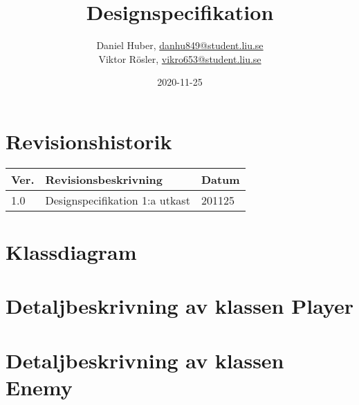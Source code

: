 \documentclass{TDP005mall}
\author{Daniel Huber, \url{danhu849@student.liu.se}\\
  Viktor Rösler, \url{vikro653@student.liu.se}}
\title{Designspecifikation}
\date{2020-11-25}
\begin{document}
\projectpage
\tableofcontents
\newpage
\section{Revisionshistorik}
\begin{table}[!h]
\begin{tabularx}{\linewidth}{|l|X|l|}
\hline
Ver. & Revisionsbeskrivning & Datum \\\hline
1.0 & Designspecifikation 1:a utkast & 201125 \\\hline
\end{tabularx}
\end{table}



\section{Klassdiagram}

\section{Detaljbeskrivning av klassen Player}

\section{Detaljbeskrivning av klassen Enemy}

\end{document}
